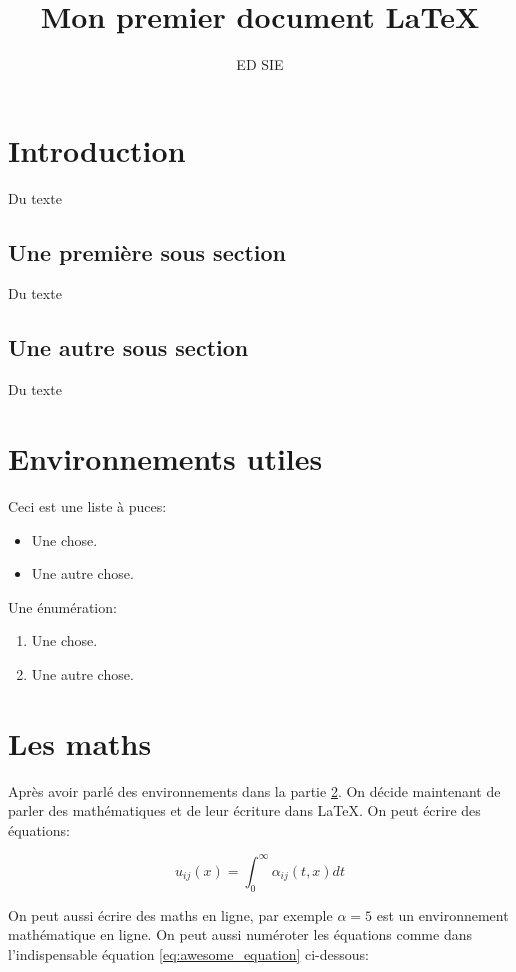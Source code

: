 \documentclass[10pt,a4paper]{article}
\title{Mon premier document \LaTeX}
\author{ED SIE}
\begin{document}
\maketitle
\tableofcontents

\section{Introduction}
Du texte 
\subsection{Une première sous section}
Du texte 
\subsection{Une autre sous section}
Du texte 



\section{Environnements utiles}
\label{sec:environnements}

Ceci est une liste à puces:

\begin{itemize}
	\item Une chose.
	\item Une autre chose.
\end{itemize}

Une énumération:

\begin{enumerate}
	\item Une chose.
	\item Une autre chose.
\end{enumerate}


\section{Les maths}
Après avoir parlé des environnements dans la partie \ref{sec:environnements}. On décide maintenant de parler des mathématiques et de leur écriture dans \LaTeX. On peut écrire des équations:

$$
u_{ij}(x) = \int_0^\infty \alpha_{ij}(t,x) dt
$$

On peut aussi écrire des maths en ligne, par exemple $\alpha = 5$ est un environnement mathématique en ligne. On peut aussi numéroter les équations comme dans l'indispensable équation \ref{eq:awesome_equation} ci-dessous:
\end{document}

